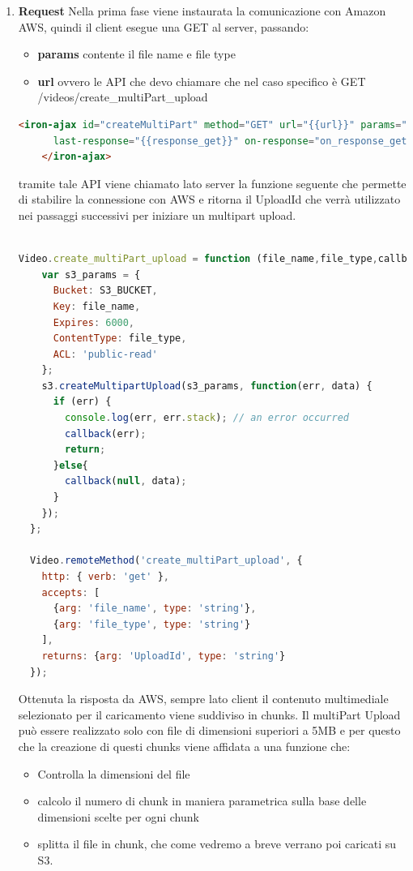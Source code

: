 \begin{enumerate}
\item \textbf{Request}
   Nella prima fase viene instaurata la comunicazione con Amazon AWS, quindi il client esegue una GET al server, passando:
   \begin{itemize}
      \item \textbf{params} contente il file name e file type
      \item \textbf{url} ovvero le API che devo chiamare che nel caso specifico è GET /videos/create\_multiPart\_upload
    \end{itemize}

  \begin{lstlisting}[language=html]
    <iron-ajax id="createMultiPart" method="GET" url="{{url}}" params="{{params}}"
      last-response="{{response_get}}" on-response="on_response_get">
    </iron-ajax>
\end{lstlisting}

tramite tale API viene chiamato lato server la funzione seguente che permette di stabilire la connessione con AWS e ritorna il UploadId che verrà utilizzato nei passaggi successivi per iniziare un multipart upload.

\begin{lstlisting}[language=javascript]

Video.create_multiPart_upload = function (file_name,file_type,callback){
    var s3_params = {
      Bucket: S3_BUCKET,
      Key: file_name,
      Expires: 6000,
      ContentType: file_type,
      ACL: 'public-read'      
    };
    s3.createMultipartUpload(s3_params, function(err, data) {
      if (err) {
        console.log(err, err.stack); // an error occurred
        callback(err);
        return;
      }else{
        callback(null, data);
      }
    });
  };
  
  Video.remoteMethod('create_multiPart_upload', {
    http: { verb: 'get' },
    accepts: [
      {arg: 'file_name', type: 'string'},
      {arg: 'file_type', type: 'string'}
    ],
    returns: {arg: 'UploadId', type: 'string'}
  });

\end{lstlisting}
Ottenuta la risposta da AWS, sempre lato client il contenuto multimediale selezionato per il caricamento viene suddiviso in chunks.
Il multiPart Upload può essere realizzato solo con file di dimensioni superiori a 5MB e per questo che la creazione di questi chunks viene affidata a una funzione che:
\begin{itemize}
      \item Controlla la dimensioni del file
      \item calcolo il numero di chunk in maniera parametrica sulla base delle dimensioni scelte per ogni chunk
      \item splitta il file in chunk, che come vedremo a breve verrano poi caricati su S3.
    \end{itemize}



\end{enumerate}
